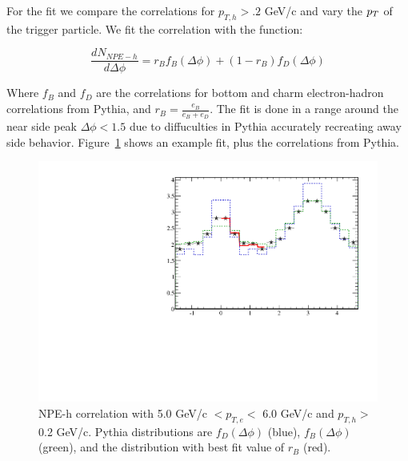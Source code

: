 For the fit we compare the correlations for $p_{T,h} > .2$ GeV/c and vary the $p_{T}$ of the trigger particle. We fit the correlation with the function:

\begin{equation}\label{eq:BDfitfunc}
\frac{dN_{NPE-h}}{d\Delta\phi} = r_B f_B(\Delta\phi) + (1 - r_B) f_D(\Delta\phi)
\end{equation}

Where $f_B$ and $f_D$ are the correlations for bottom and charm electron-hadron correlations from Pythia, and $r_B = \frac{e_B}{e_B + e_D}$. The fit is done in a range around the near side peak $\Delta\phi < 1.5$ due to diffuculties in Pythia accurately recreating away side behavior. Figure~\ref{fig:exfit} shows an example fit, plus the correlations from Pythia.

\begin{figure}[htbp]
\begin{center}
\includegraphics[scale=.75]{Plots/Correlations/charm_corr_primpt_5_5_assopt_0_9.pdf}
\end{center}
\caption[D/B Ratio Fit Example]{NPE-h correlation with 5.0 GeV/c $< p_{T,e} <$ 6.0 GeV/c and $p_{T,h} >$ 0.2 GeV/c. Pythia distributions are $f_D(\Delta\phi)$ (blue), $f_B(\Delta\phi)$ (green), and the distribution with best fit value of $r_B$ (red).}
\label{fig:exfit}
\end{figure}

